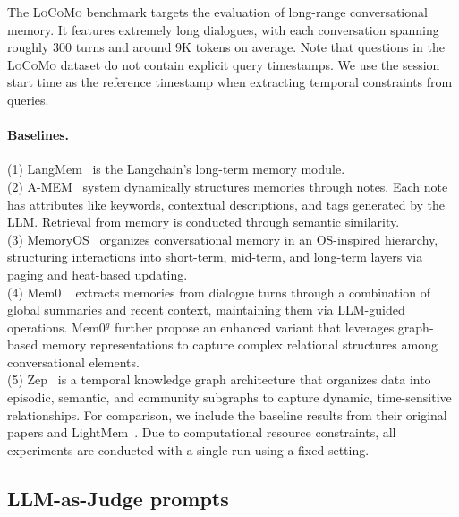 \documentclass[11pt]{article}
\begin{document}
The \textsc{LoCoMo} benchmark targets the evaluation of long-range conversational memory. It features extremely long dialogues, with each conversation spanning roughly 300 turns and around 9K tokens on average. Note that questions in the \textsc{LoCoMo} dataset do not contain explicit query timestamps. We use the session start time as the reference timestamp when extracting temporal constraints from queries.

\paragraph{Baselines.}
 (1) LangMem~\cite{langchain_langchain_nodate} is the Langchain's long-term memory module.\\
 (2) A-MEM~\cite{xu2025mem} system dynamically structures memories through notes. Each note has attributes like keywords, contextual descriptions, and tags generated by the LLM. Retrieval from memory is conducted through semantic similarity.\\
 (3) MemoryOS~\citep{kang_memory_nodate} organizes conversational memory in an OS-inspired hierarchy, structuring interactions into short-term, mid-term, and long-term layers via paging and heat-based updating.\\
 (4) Mem0 ~\citep{chhikara2025mem0} extracts memories from dialogue turns through a combination of global summaries and recent context, maintaining them via LLM-guided operations. Mem0$^g$ further propose an enhanced variant that leverages graph-based memory representations to capture complex relational structures among conversational elements.\\
 (5) Zep~\citep{rasmussen_zep_2025} is a temporal knowledge graph architecture that organizes data into episodic, semantic, and community subgraphs to capture dynamic, time-sensitive relationships. 
For comparison, we include the baseline results from their original papers and LightMem~\cite{fang_lightmem_2025}. Due to computational resource constraints, all experiments are conducted with a single run using a fixed setting. 
\subsection{LLM-as-Judge prompts}
\label{prompts:LLM-as-Judge}
\end{document}
